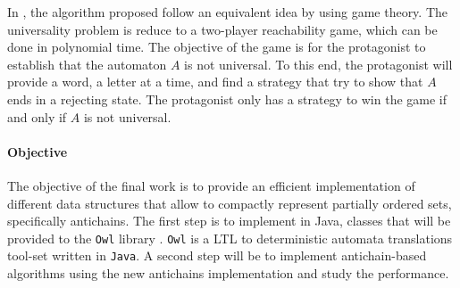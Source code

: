 \documentclass[letterpaper]{article}
\DeclarePairedDelimiter{\ceil}{\lceil}{\rceil}
\theoremstyle{definition}
\begin{document}


In
\cite{AC_universality}, the algorithm proposed follow an equivalent
idea by using game theory. The universality problem is reduce to
a two-player reachability game, which can be done in polynomial time.
The objective of the game is for the protagonist to establish that
the automaton $A$ is not universal. To this end, the protagonist will
provide a word, a letter at a time, and find a strategy that try
to show that $A$ ends in a rejecting state.
The protagonist only has a strategy to win the game if and only if $A$ is
not universal.

\paragraph{Objective}

The objective of the final work
is to provide an efficient implementation of different
data structures that allow to compactly
represent partially ordered sets, specifically antichains.
The first step is to implement in Java, classes that will be provided to
the \texttt{Owl} library \cite{owl}.
\texttt{Owl} is a LTL to deterministic automata translations tool-set written
in \texttt{Java}. A second step will be to implement
antichain-based algorithms using the new antichains implementation and
study the performance.
\end{document}

